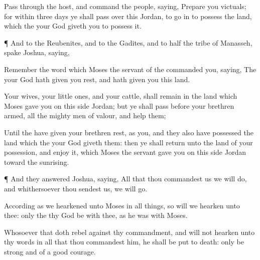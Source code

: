 {Pass
through the
host, and
command the
people,
saying,
Prepare you
victuals; for within
three
days ye shall pass
over this
Jordan, to go
in to
possess the
land, which the
{} your
God
giveth you to
possess it.


\par }{\PP {}¶ And to the
Reubenites, and to the
Gadites, and to
half the
tribe of
Manasseh,
spake
Joshua,
saying,

Remember the
word which
Moses the
servant of the
{}
commanded you,
saying, The
{} your
God hath given you
rest, and hath
given you this
land.

Your
wives, your little
ones, and your
cattle, shall
remain in the
land which
Moses
gave you on this
side
Jordan; but ye shall
pass
before your
brethren
armed, all the
mighty men of
valour, and
help them;

Until the
{} have
given your
brethren
rest, as
{} you, and they also have
possessed the
land which the
{} your
God
giveth them: then ye shall
return unto the
land of your
possession, and
enjoy it, which
Moses the
{}
servant
gave you on this
side
Jordan toward the
sunrising.


\par }{\PP {}¶ And they
answered
Joshua,
saying, All that thou
commandest us we will
do, and
whithersoever thou
sendest us, we will
go.

According as we
hearkened unto
Moses in all things, so will we
hearken unto thee: only the
{} thy
God be with thee, as he was with
Moses.

Whosoever
{} that doth
rebel against thy
commandment, and will not
hearken unto thy
words in all that thou
commandest him, he shall be put to
death: only be
strong and of a good
courage.




\par }
